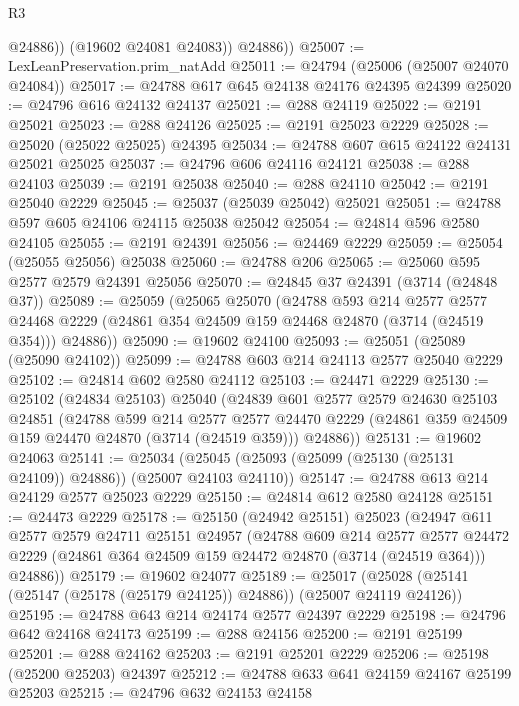 \begin{lexlean}{R3}
\begin{coremodule}
              @24886))
          (@19602 @24081 @24083))
        @24886))
@25007 := LexLeanPreservation.prim_natAdd
@25011 := @24794 (@25006 (@25007 @24070 @24084))
@25017 := @24788 @617 @645 @24138 @24176 @24395 @24399
@25020 := @24796 @616 @24132 @24137
@25021 := @288 @24119
@25022 := @2191 @25021
@25023 := @288 @24126
@25025 := @2191 @25023 @2229
@25028 := @25020 (@25022 @25025) @24395
@25034 := @24788 @607 @615 @24122 @24131 @25021 @25025
@25037 := @24796 @606 @24116 @24121
@25038 := @288 @24103
@25039 := @2191 @25038
@25040 := @288 @24110
@25042 := @2191 @25040 @2229
@25045 := @25037 (@25039 @25042) @25021
@25051 := @24788 @597 @605 @24106 @24115 @25038 @25042
@25054 := @24814 @596 @2580 @24105
@25055 := @2191 @24391
@25056 := @24469 @2229
@25059 := @25054 (@25055 @25056) @25038
@25060 := @24788 @206
@25065 := @25060 @595 @2577 @2579 @24391 @25056
@25070 := @24845 @37 @24391 (@3714 (@24848 @37))
@25089 := @25059
    (@25065
      @25070
      (@24788
        @593
        @214
        @2577
        @2577
        @24468
        @2229
        (@24861 @354 @24509 @159 @24468 @24870 (@3714 (@24519 @354)))
        @24886))
@25090 := @19602 @24100
@25093 := @25051 (@25089 (@25090 @24102))
@25099 := @24788 @603 @214 @24113 @2577 @25040 @2229
@25102 := @24814 @602 @2580 @24112
@25103 := @24471 @2229
@25130 := @25102
    (@24834 @25103)
    @25040
    (@24839
      @601
      @2577
      @2579
      @24630
      @25103
      @24851
      (@24788
        @599
        @214
        @2577
        @2577
        @24470
        @2229
        (@24861 @359 @24509 @159 @24470 @24870 (@3714 (@24519 @359)))
        @24886))
@25131 := @19602 @24063
@25141 := @25034 (@25045 (@25093 (@25099 (@25130 (@25131 @24109)) @24886)) (@25007 @24103 @24110))
@25147 := @24788 @613 @214 @24129 @2577 @25023 @2229
@25150 := @24814 @612 @2580 @24128
@25151 := @24473 @2229
@25178 := @25150
    (@24942 @25151)
    @25023
    (@24947
      @611
      @2577
      @2579
      @24711
      @25151
      @24957
      (@24788
        @609
        @214
        @2577
        @2577
        @24472
        @2229
        (@24861 @364 @24509 @159 @24472 @24870 (@3714 (@24519 @364)))
        @24886))
@25179 := @19602 @24077
@25189 := @25017 (@25028 (@25141 (@25147 (@25178 (@25179 @24125)) @24886)) (@25007 @24119 @24126))
@25195 := @24788 @643 @214 @24174 @2577 @24397 @2229
@25198 := @24796 @642 @24168 @24173
@25199 := @288 @24156
@25200 := @2191 @25199
@25201 := @288 @24162
@25203 := @2191 @25201 @2229
@25206 := @25198 (@25200 @25203) @24397
@25212 := @24788 @633 @641 @24159 @24167 @25199 @25203
@25215 := @24796 @632 @24153 @24158

\end{coremodule}
\end{lexlean}
